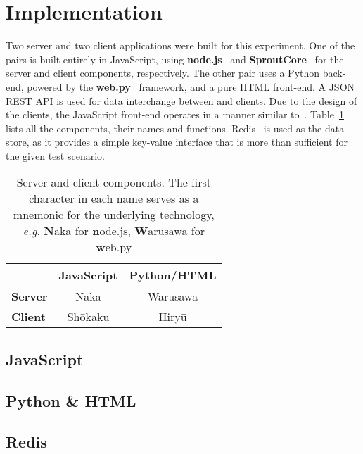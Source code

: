 \section{\label{sec:impl}Implementation}

Two server and two client applications were built for this experiment. One of the pairs is built entirely in JavaScript, using \textbf{node.js}~\cite{node} and \textbf{SproutCore}~\cite{sprout} for the server and client components, respectively. The other pair uses a Python back-end, powered by the \textbf{web.py}~\cite{webpy} framework, and a pure HTML front-end. A JSON~\cite{rfc4627} REST API is used for data interchange between and clients. Due to the design of the clients, the JavaScript front-end operates in a manner similar to~\cite{flyhtml}. Table~\ref{tab:comps} lists all the components, their names and functions. Redis~\cite{redis} is used as the data store, as it provides a simple key-value interface that is more than sufficient for the given test scenario.

\begin{table}
    \begin{center}
        \begin{tabular}{l c c}
            \toprule
            & \textbf{JavaScript} & \textbf{Python/HTML} \\
            \midrule
            \textbf{Server} & Naka & Warusawa \\
            \textbf{Client} & Sh\={o}kaku & Hiry\={u}\\
            \bottomrule
        \end{tabular}
        \caption{Server and client components. The first character in each name serves as a mnemonic for the underlying technology, \emph{e.g.} \textbf{N}aka for \textbf{n}ode.js, \textbf{W}arusawa for \textbf{w}eb.py}
        \label{tab:comps}
    \end{center}
\end{table}

\subsection{\label{sec:impl:js}JavaScript}

\subsection{\label{sec:impl:pyhtml}Python \& HTML}

\subsection{\label{sec:impl:redis}Redis}